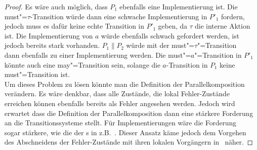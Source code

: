 \begin{proof}
  Es wäre auch möglich, dass $P_1$ ebenfalls eine Implementierung ist. Die
  must"=$\tau$-Transition würde dann eine schwache Implementierung in $P'_1$
  fordern, jedoch muss es dafür keine echte Transition in $P'_1$ geben, da
  $\tau$ die interne Aktion ist. Die Implementierung von $a$ würde ebenfalls
  schwach gefordert werden, ist jedoch bereits stark vorhanden. $P_1\|P_2$
  würde mit der must"=$\tau$"=Transition dann ebenfalls zu einer
  Implementierung werden. Die must"=$a$"=Transition in $P'_1$ könnte auch eine
  may"=Transition sein, solange die $a$-Transition in $P_1$ keine
  must"=Transition ist.\\
  Um dieses Problem zu lösen könnte man die Definition der Parallelkomposition
  verändern. Es wäre denkbar, dass alle Zustände, die lokal Fehler-Zustände
  erreichen können ebenfalls bereits als Fehler angesehen werden. Jedoch wird
  erwartet dass die Definition der Parallelkomposition dann eine stärkere
  Forderung an die Transitionssysteme stellt. Für Implementierungen wäre die
  Forderung sogar stärkere, wie die der \EIO{}s in z.B.~\cite{Schinko2016BA}.
  Dieser Ansatz käme jedoch dem Vorgehen des Abschneidens der Fehler-Zustände
  mit ihren lokalen Vorgängern in~\cite{Vogler2016MIA3} näher.
\end{proof}


